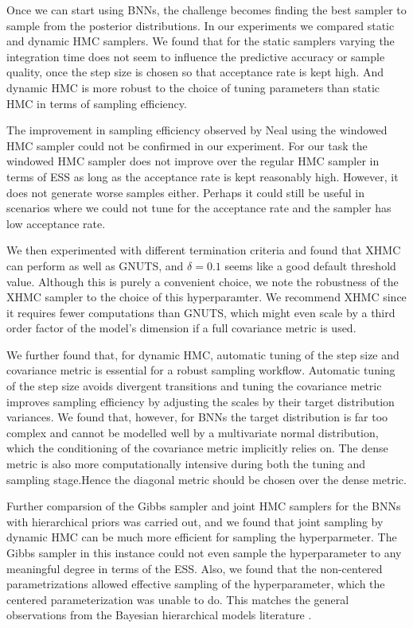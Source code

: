 \documentclass[12pt]{report}
\begin{document}
Once we can start using BNNs, the challenge becomes finding the best sampler to sample from the posterior distributions. In our experiments we compared static and dynamic HMC samplers. We found that for the static samplers varying the integration time does not seem to influence the predictive accuracy or sample quality, once the step size is chosen so that acceptance rate is kept high. And dynamic HMC is more robust to the choice of tuning parameters than static HMC in terms of sampling efficiency. 

The improvement in sampling efficiency observed by Neal using the windowed HMC sampler \cite{neal2012bayesian} could not be confirmed in our experiment. For our task the windowed HMC sampler does not improve over the regular HMC sampler in terms of ESS as long as the acceptance rate is kept reasonably high. However, it does not generate worse samples either. Perhaps it could still be useful in scenarios where we could not tune for the acceptance rate and the sampler has low acceptance rate.

We then experimented with different termination criteria and found that XHMC can perform as well as GNUTS, and $\delta = 0.1$ seems like a good default threshold value. Although this is purely a convenient choice, we note the robustness of the XHMC sampler to the choice of this hyperparamter. We recommend XHMC since it requires fewer computations than GNUTS, which might even scale by a third order factor of the model's dimension if a full covariance metric is used.

We further found that, for dynamic HMC, automatic tuning of the step size and covariance metric is essential for a robust sampling workflow. Automatic tuning of the step size avoids divergent transitions and tuning the covariance metric improves sampling efficiency by adjusting the scales by their target distribution variances. We found that, however, for BNNs the target distribution is far too complex and cannot be modelled well by a multivariate normal distribution, which the conditioning of the covariance metric implicitly relies on. The dense metric is also more computationally intensive during both the tuning and sampling stage.Hence the diagonal metric should be chosen over the dense metric.

Further comparsion of the Gibbs sampler and joint HMC samplers for the BNNs with hierarchical priors was carried out, and we found that joint sampling by dynamic HMC can be much more efficient for sampling the hyperparmeter. The Gibbs sampler in this instance could not even sample the hyperparameter to any meaningful degree in terms of the ESS. Also, we found that the non-centered parametrizations allowed effective sampling of the hyperparameter, which the centered parameterization was unable to do. This matches the general observations from the Bayesian hierarchical models literature \cite{bernardo2003non}.
\end{document}

